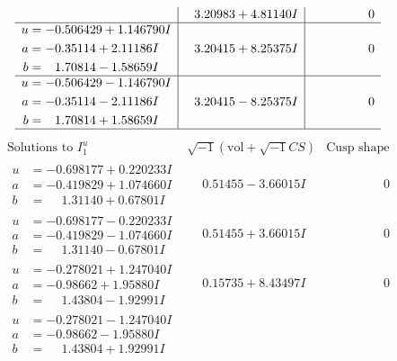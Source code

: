 \documentclass[1p]{elsarticle_modified}
\theoremstyle{definition}
\newcommand{\I}{\sqrt{-1}}
\begin{document}
$$\begin{array}{c|c|c}
 & \phantom{-}3.20983 + 4.81140 I & \phantom{-0.000000 } 0 \\ \hline\begin{aligned}
u &= -0.506429 + 1.146790 I \\
a &= -0.35114 + 2.11186 I \\
b &= \phantom{-}1.70814 - 1.58659 I\end{aligned}
 & \phantom{-}3.20415 + 8.25375 I & \phantom{-0.000000 } 0 \\ \hline\begin{aligned}
u &= -0.506429 - 1.146790 I \\
a &= -0.35114 - 2.11186 I \\
b &= \phantom{-}1.70814 + 1.58659 I\end{aligned}
 & \phantom{-}3.20415 - 8.25375 I & \phantom{-0.000000 } 0\\
 \hline 
 \end{array}$$\newpage$$\begin{array}{c|c|c}  
\text{Solutions to }I^u_{1}& \I (\text{vol} + \sqrt{-1}CS) & \text{Cusp shape}\\
 \hline 
\begin{aligned}
u &= -0.698177 + 0.220233 I \\
a &= -0.419829 + 1.074660 I \\
b &= \phantom{-}1.31140 + 0.67801 I\end{aligned}
 & \phantom{-}0.51455 - 3.66015 I & \phantom{-0.000000 } 0 \\ \hline\begin{aligned}
u &= -0.698177 - 0.220233 I \\
a &= -0.419829 - 1.074660 I \\
b &= \phantom{-}1.31140 - 0.67801 I\end{aligned}
 & \phantom{-}0.51455 + 3.66015 I & \phantom{-0.000000 } 0 \\ \hline\begin{aligned}
u &= -0.278021 + 1.247040 I \\
a &= -0.98662 + 1.95880 I \\
b &= \phantom{-}1.43804 - 1.92991 I\end{aligned}
 & \phantom{-}0.15735 + 8.43497 I & \phantom{-0.000000 } 0 \\ \hline\begin{aligned}
u &= -0.278021 - 1.247040 I \\
a &= -0.98662 - 1.95880 I \\
b &= \phantom{-}1.43804 + 1.92991 I\end{aligned}

\end{array}$$
\end{document}
